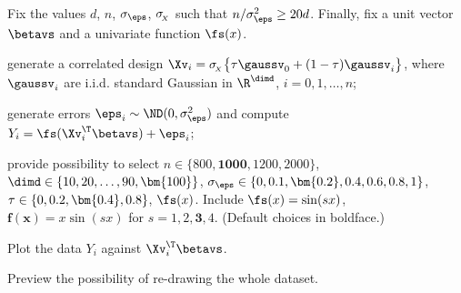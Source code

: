 \label{SdesignSI}
Fix the values \( d \), \( n \), \( \sigma_{\eps} \), \( \sigma_{\!_{X}} \) such that \( n/\sigma_{\eps}^{2} \geq 20 d \).
Finally, fix a unit vector \( \betavs \) and a univariate function \( \fs(x) \).
\begin{mylist}

\item 
generate a correlated design \( \Xv_{i} = \sigmaX \bigl\{ \corr \gaussv_{0} + (1 - \corr) \gaussv_{i} \bigr\} \),
where \( \gaussv_{i} \) are i.i.d. standard Gaussian in \( \R^{\dimd} \), \( i=0,1,\ldots,n \);
\item 
generate errors \( \eps_{i} \sim \ND(0,\sigma_{\eps}^{2}) \) and compute \( Y_{i} = \fs(\Xv_{i}^{\T} \betavs) + \eps_{i} \);

\end{mylist}

{\color{blue} 
\begin{mylist}
\item
provide possibility to select \( n \in \{ 800, \bm{1000}, 1200, 2000 \} \), \( \dimd \in \{ 10, 20,\ldots, 90, \bm{100} \} \), 
\( \sigma_{\eps} \in \{ 0, 0.1, \bm{0.2}, 0.4, 0.6, 0.8, 1 \} \), \( \corr \in \{ 0,0.2,\bm{0.4},0.8 \} \), \( \fs(x) \).
Include \( \fs(x) = \sin(sx) \), \( \bm{f(x)} = x \sin(s x) \) for \( s=1,2,\bm{3},4 \).
(Default choices in boldface.)
\item

Plot the data \( Y_{i} \) against \( \Xv_{i}^{\T} \betavs \).
\item
Preview the possibility of re-drawing the whole dataset.
\end{mylist}
}

